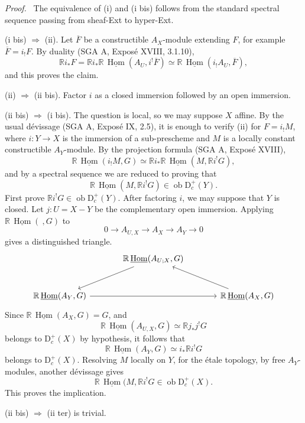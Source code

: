 \documentclass[11pt]{article}
\newenvironment{prooftext}[1][Proof]{\par\noindent\emph{#1.}\ }{\par\medskip}
\DeclareMathOperator{\Hom}{Hom}
\newcommand{\D}{\mathrm{D}}
\newcommand{\ob}{\operatorname{ob}}
\newcommand{\ol}[1]{\overline{#1}}
\providecommand{\Hom}{\operatorname{Hom}}
\providecommand{\ob}{\operatorname{ob}}
\providecommand{\Hom}{\operatorname{Hom}}
\begin{document}
\begin{prooftext}
The equivalence of (i) and (i bis) follows from the standard spectral sequence passing from sheaf-Ext to hyper-Ext.

(i bis) $\Rightarrow$ (ii). Let $\ol F$ be a constructible $A_X$-module extending $F$, for example $\ol F=i_!F$. By duality (SGA A, Exposé XVIII, 3.1.10),
\[
   \mathbb{R} i_*F
    =\mathbb{R} i_*\mathbb{R}\,\underline{\Hom}(A_U,i^!\ol F)
    \simeq
      \mathbb{R}\,\underline{\Hom}(i_!A_U,\ol F),
\]
and this proves the claim.

(ii) $\Rightarrow$ (ii bis). Factor $i$ as a closed immersion followed by an open immersion.

(ii bis) $\Rightarrow$ (i bis). The question is local, so we may suppose $X$ affine. By the usual dévissage (SGA A, Exposé IX, 2.5), it is enough to verify (ii) for $F=i_!M$, where $i:Y\to X$ is the immersion of a sub-prescheme and $M$ is a locally constant constructible $A_Y$-module. By the projection formula (SGA A, Exposé XVIII),
\[
   \mathbb{R}\,\underline{\Hom}(i_!M,G)
      \simeq
   \mathbb{R} i_*\mathbb{R}\,\underline{\Hom}(M,\mathbb{R} i^!G),
\]
and by a spectral sequence we are reduced to proving that
\[
   \mathbb{R}\,\underline{\Hom}(M,\mathbb{R} i^!G)\in\ob\D_c^+(Y).
\]
First prove $\mathbb{R} i^!G\in\ob\D_c^+(Y)$. After factoring $i$, we may suppose that $Y$ is closed. Let $j:U=X-Y$ be the complementary open immersion. Applying $\mathbb{R}\,\underline{\Hom}(\ ,G)$ to
\[
   0\longrightarrow A_{U,X}\longrightarrow A_X\longrightarrow A_Y\longrightarrow0
\]
gives a distinguished triangle.
\[
\begin{tikzcd}[column sep=large,row sep=large]
& \mathbb{R}\,\underline{\Hom}(A_{U;X},G) \arrow[dl] & \\
\mathbb{R}\,\underline{\Hom}(A_Y,G) \arrow[rr] & & \mathbb{R}\,\underline{\Hom}(A_X,G) \arrow[ul]
\end{tikzcd}
\]
Since $\mathbb{R}\,\underline{\Hom}(A_X,G)=G$, and
\[
   \mathbb{R}\,\underline{\Hom}(A_{U,X},G)\simeq\mathbb{R} j_*j^!G
\]
belongs to $\D_c^+(X)$ by hypothesis, it follows that
\[
   \mathbb{R}\,\underline{\Hom}(A_Y,G)\simeq i_*\mathbb{R} i^!G
\]
belongs to $\D_c^+(X)$. Resolving $M$ locally on $Y$, for the étale topology, by free $A_Y$-modules, another dévissage gives
\[
   \mathbb{R}\,\underline{\Hom}(M,\mathbb{R} i^!G\in\ob\D_c^+(X).
\]
This proves the implication.

(ii bis) $\Rightarrow$ (ii ter) is trivial.


\end{prooftext}
\end{document}
